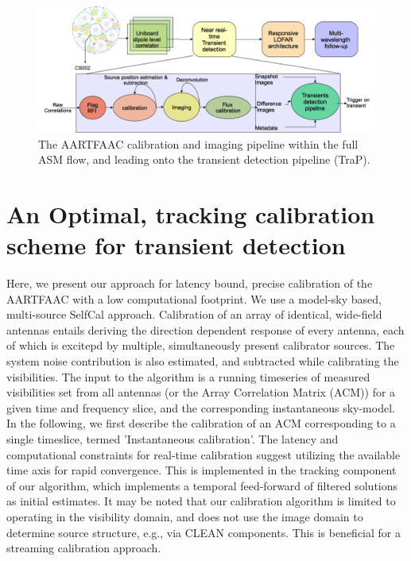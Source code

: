 \documentclass{aa}
\begin{document}
\begin{figure}[tbh]
\centering
\includegraphics[width=1\textwidth]{Figs/AFAAC_blkdia_latest.png}

\caption{\label{fig:The-AARTFAAC-calibration}The AARTFAAC calibration and
imaging pipeline within the full ASM flow, and leading onto the transient
detection pipeline (TraP).}
\end{figure}



\section{\label{sec:An-Optimal,-tracking}An Optimal, tracking calibration
scheme for transient detection}

Here, we present our approach for latency bound, precise calibration
of the AARTFAAC with a low computational footprint. We use a model-sky
based, multi-source SelfCal approach\citep{wijnholds2009multisource}.
Calibration of an array of identical, wide-field antennas entails
deriving the direction dependent response of every antenna, each of
which is excitepd by multiple, simultaneously present calibrator sources.
The system noise contribution is also estimated, and subtracted while
calibrating the visibilities. The input to the algorithm is a running
timeseries of measured visibilities set from all antennas (or the
Array Correlation Matrix (ACM)) for a given time and frequency slice,
and the corresponding instantaneous sky-model. In the following, we
first describe the calibration of an ACM corresponding to a single
timeslice, termed 'Instantaneous calibration'. The latency and computational
constraints for real-time calibration suggest utilizing the available
time axis for rapid convergence. This is implemented in the tracking
component of our algorithm, which implements a temporal feed-forward
of filtered solutions as initial estimates. It may be noted that our
calibration algorithm is limited to operating in the visibility domain,
and does not use the image domain to determine source structure, e.g.,
via CLEAN components. This is beneficial for a streaming calibration
approach.
\end{document}
